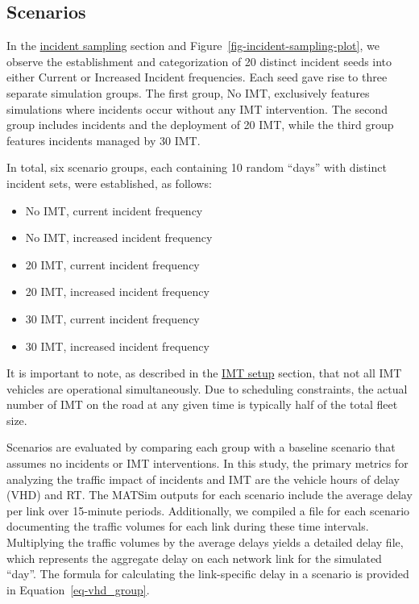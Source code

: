\documentclass[fancy, oneside, mastersfancy, ms]{byuthesis}
\providecommand{\tightlist}{%
  \setlength{\itemsep}{0pt}\setlength{\parskip}{0pt}}\usepackage{longtable,booktabs,array}
\begin{document}
\hypertarget{sec-scenarios}{%
\subsection{Scenarios}\label{sec-scenarios}}

In the \protect\hyperlink{sec-inc_data}{incident sampling} section and
Figure~\ref{fig-incident-sampling-plot}, we observe the establishment
and categorization of 20 distinct incident seeds into either Current or
Increased Incident frequencies. Each seed gave rise to three separate
simulation groups. The first group, No IMT, exclusively features
simulations where incidents occur without any IMT intervention. The
second group includes incidents and the deployment of 20 IMT, while the
third group features incidents managed by 30 IMT.

In total, six scenario groups, each containing 10 random ``days'' with
distinct incident sets, were established, as follows:

\begin{itemize}
\tightlist
\item
  No IMT, current incident frequency
\item
  No IMT, increased incident frequency
\item
  20 IMT, current incident frequency
\item
  20 IMT, increased incident frequency
\item
  30 IMT, current incident frequency
\item
  30 IMT, increased incident frequency
\end{itemize}

It is important to note, as described in the
\protect\hyperlink{sec-IMT_setup}{IMT setup} section, that not all IMT
vehicles are operational simultaneously. Due to scheduling constraints,
the actual number of IMT on the road at any given time is typically half
of the total fleet size.

Scenarios are evaluated by comparing each group with a baseline scenario
that assumes no incidents or IMT interventions. In this study, the
primary metrics for analyzing the traffic impact of incidents and IMT
are the vehicle hours of delay (VHD) and RT. The MATSim outputs for each
scenario include the average delay per link over 15-minute periods.
Additionally, we compiled a file for each scenario documenting the
traffic volumes for each link during these time intervals. Multiplying
the traffic volumes by the average delays yields a detailed delay file,
which represents the aggregate delay on each network link for the
simulated ``day''. The formula for calculating the link-specific delay
in a scenario is provided in Equation~\ref{eq-vhd_group}.
\end{document}
